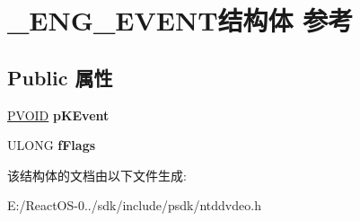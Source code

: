 \hypertarget{struct___e_n_g___e_v_e_n_t}{}\section{\+\_\+\+E\+N\+G\+\_\+\+E\+V\+E\+N\+T结构体 参考}
\label{struct___e_n_g___e_v_e_n_t}
\subsection*{Public 属性}
\begin{DoxyCompactItemize}
\item 
\mbox{\label{struct___e_n_g___e_v_e_n_t_ad878eb8b41e3cb85a09e116ad6eca271}} 
\hyperlink{interfacevoid}{P\+V\+O\+ID} {\bfseries p\+K\+Event}
\item 
\mbox{\label{struct___e_n_g___e_v_e_n_t_a14b7120bc7b964a874cdc45bc94ebf12}} 
U\+L\+O\+NG {\bfseries f\+Flags}
\end{DoxyCompactItemize}


该结构体的文档由以下文件生成\+:\begin{DoxyCompactItemize}
\item 
E\+:/\+React\+O\+S-\/0../sdk/include/psdk/ntddvdeo.\+h\end{DoxyCompactItemize}
